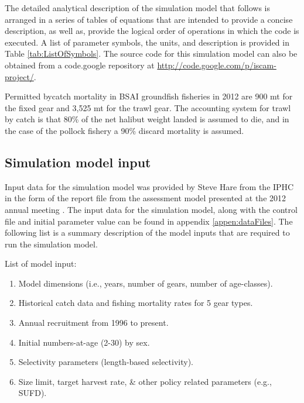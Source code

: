 The detailed analytical description of the simulation model that follows is arranged in a series of tables of equations that are intended to provide a concise description, as well as, provide the logical order of operations in which the code is executed.  A list of parameter symbols, the units, and description is provided in Table \ref{tab:ListOfSymbols}.  The source code for this simulation model can also be obtained from a code.google repository at \url{http://code.google.com/p/iscam-project/}.


Permitted bycatch mortality in BSAI groundfish fisheries in 2012 are 900 mt for the fixed gear and 3,525 mt for the trawl gear.  The accounting system for trawl by catch is that 80\% of the net halibut weight landed is assumed to die, and in the case of the pollock fishery a 90\% discard mortality is assumed.

\subsection{Simulation model input} %
\label{sub:simulation_model_input}

Input data for the simulation model was provided by Steve Hare from the IPHC in the form of the report file from the assessment model presented at the 2012 annual meeting \citep{Hare2012Rara}.  The input data for the simulation model, along with the control file and initial parameter value can be found in appendix \ref{appen:dataFiles}.  The following list is a summary description of the model inputs that are required to run the simulation model.

List of model input:
\begin{enumerate}
	\item Model dimensions (i.e., years, number of gears, number of age-classes).
	\item Historical catch data and fishing mortality rates for 5 gear types.
	\item Annual recruitment from 1996 to present.
	\item Initial numbers-at-age (2-30) by sex.
	\item Selectivity parameters (length-based selectivity).
	\item Size limit, target harvest rate, \& other policy related parameters (e.g., SUFD).
\end{enumerate}

